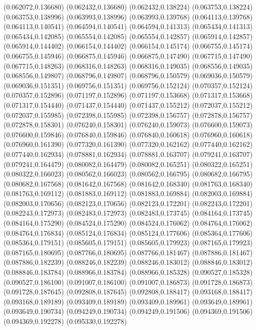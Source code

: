 (0.062072,0.136680)
(0.062432,0.136680)
(0.062432,0.138224)
(0.063753,0.138224)
(0.063753,0.138996)
(0.063993,0.138996)
(0.063993,0.139768)
(0.064113,0.139768)
(0.064113,0.140541)
(0.064594,0.140541)
(0.064594,0.141313)
(0.065434,0.141313)
(0.065434,0.142085)
(0.065554,0.142085)
(0.065554,0.142857)
(0.065914,0.142857)
(0.065914,0.144402)
(0.066154,0.144402)
(0.066154,0.145174)
(0.066755,0.145174)
(0.066755,0.145946)
(0.066875,0.145946)
(0.066875,0.147490)
(0.067715,0.147490)
(0.067715,0.148263)
(0.068316,0.148263)
(0.068316,0.149035)
(0.068556,0.149035)
(0.068556,0.149807)
(0.068796,0.149807)
(0.068796,0.150579)
(0.069036,0.150579)
(0.069036,0.151351)
(0.069756,0.151351)
(0.069756,0.152124)
(0.070357,0.152124)
(0.070357,0.152896)
(0.071197,0.152896)
(0.071197,0.153668)
(0.071317,0.153668)
(0.071317,0.154440)
(0.071437,0.154440)
(0.071437,0.155212)
(0.072037,0.155212)
(0.072037,0.155985)
(0.072398,0.155985)
(0.072398,0.156757)
(0.072878,0.156757)
(0.072878,0.158301)
(0.076240,0.158301)
(0.076240,0.159073)
(0.076600,0.159073)
(0.076600,0.159846)
(0.076840,0.159846)
(0.076840,0.160618)
(0.076960,0.160618)
(0.076960,0.161390)
(0.077320,0.161390)
(0.077320,0.162162)
(0.077440,0.162162)
(0.077440,0.162934)
(0.078881,0.162934)
(0.078881,0.163707)
(0.079241,0.163707)
(0.079241,0.164479)
(0.080082,0.164479)
(0.080082,0.165251)
(0.080322,0.165251)
(0.080322,0.166023)
(0.080562,0.166023)
(0.080562,0.166795)
(0.080682,0.166795)
(0.080682,0.167568)
(0.081642,0.167568)
(0.081642,0.168340)
(0.081763,0.168340)
(0.081763,0.169112)
(0.081883,0.169112)
(0.081883,0.169884)
(0.082003,0.169884)
(0.082003,0.170656)
(0.082123,0.170656)
(0.082123,0.172201)
(0.082243,0.172201)
(0.082243,0.172973)
(0.082483,0.172973)
(0.082483,0.173745)
(0.084164,0.173745)
(0.084164,0.175290)
(0.084524,0.175290)
(0.084524,0.176062)
(0.084764,0.176062)
(0.084764,0.176834)
(0.085124,0.176834)
(0.085124,0.177606)
(0.085364,0.177606)
(0.085364,0.179151)
(0.085605,0.179151)
(0.085605,0.179923)
(0.087165,0.179923)
(0.087165,0.180695)
(0.087766,0.180695)
(0.087766,0.181467)
(0.087886,0.181467)
(0.087886,0.182239)
(0.088246,0.182239)
(0.088246,0.183012)
(0.088846,0.183012)
(0.088846,0.183784)
(0.088966,0.183784)
(0.088966,0.185328)
(0.090527,0.185328)
(0.090527,0.186100)
(0.091007,0.186100)
(0.091007,0.186873)
(0.091728,0.186873)
(0.091728,0.187645)
(0.092808,0.187645)
(0.092808,0.188417)
(0.093168,0.188417)
(0.093168,0.189189)
(0.093409,0.189189)
(0.093409,0.189961)
(0.093649,0.189961)
(0.093649,0.190734)
(0.094249,0.190734)
(0.094249,0.191506)
(0.094369,0.191506)
(0.094369,0.192278)
(0.095330,0.192278)
